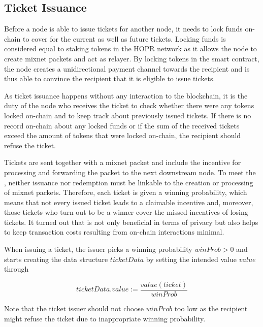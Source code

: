 \subsection{Ticket Issuance}
\label{sec:tickets:issuance}

Before a node is able to issue tickets for another node, it needs to lock funds on-chain to cover for the current as well as future tickets. Locking funds is considered equal to staking tokens in the HOPR network as it allows the node to create mixnet packets and act as relayer. By locking tokens in the smart contract, the node creates a unidirectional payment channel towards the recipient and is thus able to convince the recipient that it is eligible to issue tickets.

As ticket issuance happens without any interaction to the blockchain, it is the duty of the node who receives the ticket to check whether there were any tokens locked on-chain and to keep track about previously issued tickets. If there is no record on-chain about any locked funds or if the sum of the received tickets exceed the amount of tokens that were locked on-chain, the recipient should refuse the ticket.

Tickets are sent together with a mixnet packet and include the incentive for processing and forwarding the packet to the next downstream node. To meet the , neither issuance nor redemption must be linkable to the creation or processing of mixnet packets. Therefore, each ticket is given a winning probability, which means that not every issued ticket leads to a claimable incentive and, moreover, those tickets who turn out to be a winner cover the missed incentives of losing tickets. It turned out that is not only beneficial in terms of privacy but also helps to keep transaction costs resulting from on-chain interactions minimal.

When issuing a ticket, the issuer picks a winning probability $winProb > 0$ and starts creating the data structure $ticketData$ by setting the intended value $value$ through

$$ ticketData.value := \frac{value(ticket)}{winProb} $$

Note that the ticket issuer should not choose $winProb$ too low as the recipient might refuse the ticket due to inappropriate winning probability.

